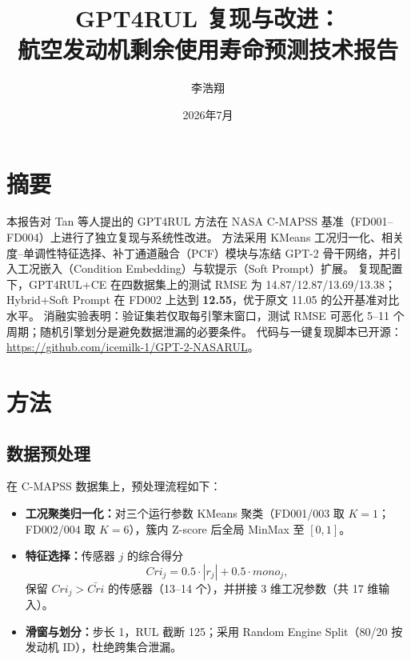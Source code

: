 \documentclass[UTF8,a4paper,10pt,twocolumn]{ctexart}
\title{\textbf{GPT4RUL 复现与改进：\\航空发动机剩余使用寿命预测技术报告}}
\author{李浩翔}
\date{2026年7月}
\begin{document}
\maketitle

\section*{摘要}

本报告对 Tan 等人提出的 GPT4RUL 方法在 NASA C-MAPSS 基准（FD001--FD004）上进行了独立复现与系统性改进。
方法采用 KMeans 工况归一化、相关度--单调性特征选择、补丁通道融合（PCF）模块与冻结 GPT-2 骨干网络，并引入工况嵌入（Condition Embedding）与软提示（Soft Prompt）扩展。
复现配置下，GPT4RUL+CE 在四数据集上的测试 RMSE 为 14.87/12.87/13.69/13.38；Hybrid+Soft Prompt 在 FD002 上达到 \textbf{12.55}，优于原文 11.05 的公开基准对比水平。
消融实验表明：验证集若仅取每引擎末窗口，测试 RMSE 可恶化 5--11 个周期；随机引擎划分是避免数据泄漏的必要条件。
代码与一键复现脚本已开源：\url{https://github.com/icemilk-1/GPT-2-NASARUL}。

\section{方法}

\subsection{数据预处理}

在 C-MAPSS 数据集上，预处理流程如下：
\begin{itemize}
  \item \textbf{工况聚类归一化：}对三个运行参数 KMeans 聚类（FD001/003 取 $K{=}1$；FD002/004 取 $K{=}6$），簇内 Z-score 后全局 MinMax 至 $[0,1]$。
  \item \textbf{特征选择：}传感器 $j$ 的综合得分
  \begin{equation}
    Cri_j = 0.5 \cdot |r_j| + 0.5 \cdot mono_j,
  \end{equation}
  保留 $Cri_j > \bar{Cri}$ 的传感器（13--14 个），并拼接 3 维工况参数（共 17 维输入）。
  \item \textbf{滑窗与划分：}步长 1，RUL 截断 125；采用 Random Engine Split（80/20 按发动机 ID），杜绝跨集合泄漏。
\end{itemize}
\end{document}
